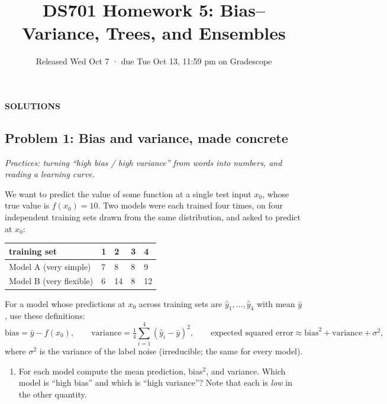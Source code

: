 \documentclass[
  11pt,
]{article}
\title{DS701 Homework 5: Bias--Variance, Trees, and Ensembles}
\subtitle{Released Wed Oct 7 · due Tue Oct 13, 11:59 pm on Gradescope}
\author{}
\date{}
\newcounter{none} %
\providecommand{\tightlist}{%
  \setlength{\itemsep}{0pt}\setlength{\parskip}{0pt}}
\newcommand{\answerspace}[1]{\par\vspace*{#1}}  %
\newcommand{\answerpage}{\clearpage}
\begin{document}
\maketitle


\begin{center}\LARGE\bfseries\color{blue!45!black} SOLUTIONS\end{center}
\renewcommand{\answerspace}[1]{}
\renewcommand{\answerpage}{\par\vspace{6pt}}

\subsection{Problem 1: Bias and variance, made
concrete}\label{problem-1-bias-and-variance-made-concrete}

\emph{Practices: turning ``high bias / high variance'' from words into
numbers, and reading a learning curve.}

We want to predict the value of some function at a single test input
\(x_0\), whose true value is \(f(x_0) = 10\). Two models were each
trained four times, on four independent training sets drawn from the
same distribution, and asked to predict at \(x_0\):

{\def\LTcaptype{none} %
\begin{longtable}[]{@{}lllll@{}}
\toprule\noalign{}
training set & 1 & 2 & 3 & 4 \\
\midrule\noalign{}
\endhead
\bottomrule\noalign{}
\endlastfoot
Model A (very simple) & 7 & 8 & 8 & 9 \\
Model B (very flexible) & 6 & 14 & 8 & 12 \\
\end{longtable}
}

For a model whose predictions at \(x_0\) across training sets are
\(\hat y_1,\dots,\hat y_4\) with mean \(\bar y\), use these definitions:
\[\text{bias} = \bar y - f(x_0),\qquad
\text{variance} = \tfrac14\textstyle\sum_{i=1}^{4}(\hat y_i-\bar y)^2,\qquad
\text{expected squared error} \approx \text{bias}^2 + \text{variance} + \sigma^2,\]
where \(\sigma^2\) is the variance of the label noise (irreducible; the
same for every model).

\newpage

\begin{enumerate}
\def\labelenumi{(\alph{enumi})}
\tightlist
\item
  For each model compute the mean prediction, bias\(^2\), and variance.
  Which model is ``high bias'' and which is ``high variance''? Note that
  each is \emph{low} in the other quantity.
\end{enumerate}
\end{document}
